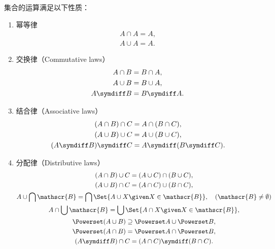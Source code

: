 \begin{property}
集合的运算满足以下性质：
\begin{enumerate}
\item 幂等律
\begin{gather}
	A \cap A = A, \\
	A \cup A = A.
\end{gather}

\item 交换律（{\rm Commutative laws}）
\begin{gather}
	A \cap B = B \cap A, \label{equation:集合论.集合代数公式1-1} \\
	A \cup B = B \cup A, \label{equation:集合论.集合代数公式1-2} \\
	A \symdiff B = B \symdiff A.
\end{gather}

\item 结合律（{\rm Associative laws}）
\begin{gather}
	(A \cap B) \cap C = A \cap (B \cap C), \label{equation:集合论.集合代数公式2-1} \\
	(A \cup B) \cup C = A \cup (B \cup C), \label{equation:集合论.集合代数公式2-2} \\
	(A \symdiff B) \symdiff C = A \symdiff (B \symdiff C).
\end{gather}

\item 分配律（{\rm Distributive laws}）
\begin{gather}
	(A \cap B) \cup C = (A \cup C) \cap (B \cup C), \label{equation:集合论.集合代数公式3-1} \\
	(A \cup B) \cap C = (A \cap C) \cup (B \cap C), \label{equation:集合论.集合代数公式3-2} \\
	A \cup \bigcap \mathscr{B} = \bigcap\Set{A \cup X \given X \in \mathscr{B}}, \quad(\mathscr{B}\neq\emptyset) \label{equation:集合论.集合代数公式3-3} \\
	A \cap \bigcup \mathscr{B} = \bigcup\Set{A \cap X \given X \in \mathscr{B}}, \label{equation:集合论.集合代数公式3-4} \\
	\Powerset (A \cup B) \supseteq \Powerset A \cup \Powerset B, \label{equation:集合论.集合代数公式3-5} \\ %
	\Powerset (A \cap B) = \Powerset A \cap \Powerset B, \label{equation:集合论.集合代数公式3-6} \\ %
	(A \symdiff B) \cap C = (A \cap C) \symdiff (B \cap C).
\end{gather}


\end{enumerate}
\end{property}
